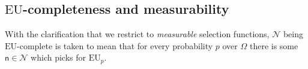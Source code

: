 \documentclass[a4paper,final]{article}
\newcommand\Exp{\mathsf{Exp}}
\newcommand\EU{\mathrm{EU}}
\newcommand\U{\mathfrak{U}} %
\newcommand{\Decs}{\mathcal{D}}
\newcommand\s{\mathsf{s}}
\newcommand{\n}{\mathsf{n}}
\renewcommand{\nu}{\n}
\newcommand\Nu{\mathcal{N}}
\renewcommand{\color}[1]{}
\newenvironment{colored}[1]{\leavevmode\color{#1}}{}
\newcommand*\diff{\mathop{}\!\mathrm{d}}
\newenvironment{CCM rewritten}
{\begingroup\color{blue}} %
{\endgroup}              %
\begin{document}
\begin{colored}{violet}

\subsection{$\EU$-completeness and measurability}

With the clarification that we restrict to \emph{measurable} selection functions, $\Nu$ being $\EU$-complete is taken to mean that for every probability $p$ over $\Omega$ there is some $\nu\in\Nu$ which picks for $\EU_p$. 


\end{colored}
\end{document}
